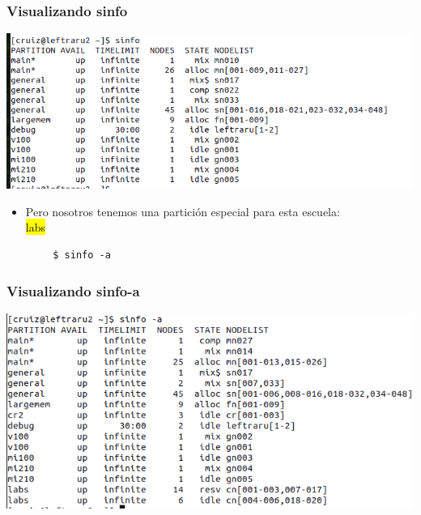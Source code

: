 \documentclass[aspectratio=169,professionalfonts]{beamer}
\begin{document}
\begin{frame}[fragile]
\frametitle{\textbf{Visualizando sinfo}}
  \centering
    \includegraphics[scale=0.3]{FIGURES/sinfo.png}   
    \begin{itemize}
        \item Pero nosotros tenemos una partición especial para esta escuela:  \\ \hl{labs} 
    \end{itemize}
    \begin{verbatim}
        $ sinfo -a 
    \end{verbatim}
\end{frame}
\begin{frame}[fragile]
\frametitle{\textbf{Visualizando sinfo-a}}
\begin{center}
\includegraphics[scale=0.3]{FIGURES/sinfo-a.png}
\end{center}
\end{frame}
\end{document}
